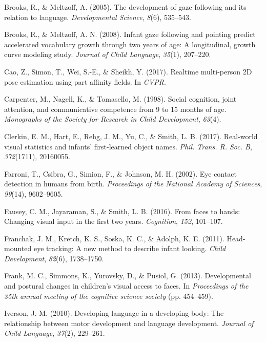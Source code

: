 \documentclass[english,man,floatsintext,draftall]{apa6}
\begin{document}
\hypertarget{ref-brooks2005}{}
Brooks, R., \& Meltzoff, A. (2005). The development of gaze following
and its relation to language. \emph{Developmental Science}, \emph{8}(6),
535--543.

\hypertarget{ref-brooks2008}{}
Brooks, R., \& Meltzoff, A. N. (2008). Infant gaze following and
pointing predict accelerated vocabulary growth through two years of age:
A longitudinal, growth curve modeling study. \emph{Journal of Child
Language}, \emph{35}(1), 207--220.

\hypertarget{ref-cao2017realtime}{}
Cao, Z., Simon, T., Wei, S.-E., \& Sheikh, Y. (2017). Realtime
multi-person 2D pose estimation using part affinity fields. In
\emph{CVPR}.

\hypertarget{ref-carpenter1998}{}
Carpenter, M., Nagell, K., \& Tomasello, M. (1998). Social cognition,
joint attention, and communicative competence from 9 to 15 months of
age. \emph{Monographs of the Society for Research in Child Development},
\emph{63}(4).

\hypertarget{ref-clerkin2017}{}
Clerkin, E. M., Hart, E., Rehg, J. M., Yu, C., \& Smith, L. B. (2017).
Real-world visual statistics and infants' first-learned object names.
\emph{Phil. Trans. R. Soc. B}, \emph{372}(1711), 20160055.

\hypertarget{ref-farroni2002eye}{}
Farroni, T., Csibra, G., Simion, F., \& Johnson, M. H. (2002). Eye
contact detection in humans from birth. \emph{Proceedings of the
National Academy of Sciences}, \emph{99}(14), 9602--9605.

\hypertarget{ref-fausey2016}{}
Fausey, C. M., Jayaraman, S., \& Smith, L. B. (2016). From faces to
hands: Changing visual input in the first two years. \emph{Cognition},
\emph{152}, 101--107.

\hypertarget{ref-franchak2011}{}
Franchak, J. M., Kretch, K. S., Soska, K. C., \& Adolph, K. E. (2011).
Head-mounted eye tracking: A new method to describe infant looking.
\emph{Child Development}, \emph{82}(6), 1738--1750.

\hypertarget{ref-frank2013}{}
Frank, M. C., Simmons, K., Yurovsky, D., \& Pusiol, G. (2013).
Developmental and postural changes in children's visual access to faces.
In \emph{Proceedings of the 35th annual meeting of the cognitive science
society} (pp. 454--459).

\hypertarget{ref-iverson2010}{}
Iverson, J. M. (2010). Developing language in a developing body: The
relationship between motor development and language development.
\emph{Journal of Child Language}, \emph{37}(2), 229--261.
\end{document}
